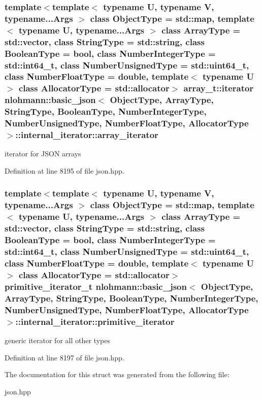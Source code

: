\subsubsection[{array\+\_\+iterator}]{\setlength{\rightskip}{0pt plus 5cm}template$<$template$<$ typename U, typename V, typename...\+Args $>$ class Object\+Type = std\+::map, template$<$ typename U, typename...\+Args $>$ class Array\+Type = std\+::vector, class String\+Type  = std\+::string, class Boolean\+Type  = bool, class Number\+Integer\+Type  = std\+::int64\+\_\+t, class Number\+Unsigned\+Type  = std\+::uint64\+\_\+t, class Number\+Float\+Type  = double, template$<$ typename U $>$ class Allocator\+Type = std\+::allocator$>$ array\+\_\+t\+::iterator {\bf nlohmann\+::basic\+\_\+json}$<$ Object\+Type, Array\+Type, String\+Type, Boolean\+Type, Number\+Integer\+Type, Number\+Unsigned\+Type, Number\+Float\+Type, Allocator\+Type $>$\+::internal\+\_\+iterator\+::array\+\_\+iterator}\label{structnlohmann_1_1basic__json_1_1internal__iterator_af92f51f4d6c715e46b1e1f8dface2be9}


iterator for J\+S\+O\+N arrays 



Definition at line 8195 of file json.\+hpp.

\hypertarget{structnlohmann_1_1basic__json_1_1internal__iterator_ac7eab7e31d99f301ba366ee274769771}{}
\subsubsection[{primitive\+\_\+iterator}]{\setlength{\rightskip}{0pt plus 5cm}template$<$template$<$ typename U, typename V, typename...\+Args $>$ class Object\+Type = std\+::map, template$<$ typename U, typename...\+Args $>$ class Array\+Type = std\+::vector, class String\+Type  = std\+::string, class Boolean\+Type  = bool, class Number\+Integer\+Type  = std\+::int64\+\_\+t, class Number\+Unsigned\+Type  = std\+::uint64\+\_\+t, class Number\+Float\+Type  = double, template$<$ typename U $>$ class Allocator\+Type = std\+::allocator$>$ {\bf primitive\+\_\+iterator\+\_\+t} {\bf nlohmann\+::basic\+\_\+json}$<$ Object\+Type, Array\+Type, String\+Type, Boolean\+Type, Number\+Integer\+Type, Number\+Unsigned\+Type, Number\+Float\+Type, Allocator\+Type $>$\+::internal\+\_\+iterator\+::primitive\+\_\+iterator}\label{structnlohmann_1_1basic__json_1_1internal__iterator_ac7eab7e31d99f301ba366ee274769771}


generic iterator for all other types 



Definition at line 8197 of file json.\+hpp.



The documentation for this struct was generated from the following file\+:\begin{DoxyCompactItemize}
\item 
json.\+hpp\end{DoxyCompactItemize}
